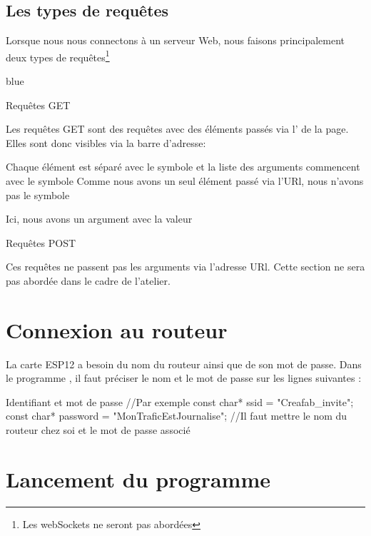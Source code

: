 \subsection{Les types de requêtes}

Lorsque nous nous connectons à un serveur Web, nous faisons principalement deux types de requêtes\footnote{Les webSockets ne 
seront pas abordées}
\begin{items}{blue}{\Triangle}
\item Requêtes GET

Les requêtes GET sont des requêtes avec des éléments passés via l' de la page.
Elles sont donc visibles via la barre d'adresse: 


Chaque élément est séparé avec le symbole  et la liste des arguments commencent avec le symbole  
Comme nous avons un seul élément passé via l'URl, nous n'avons pas le symbole 

Ici, nous avons un argument  avec la valeur 

\item Requêtes POST

Ces requêtes ne passent pas les arguments via l'adresse URl. Cette section ne sera pas abordée dans le cadre de l'atelier.
\end{items}

\section{Connexion au routeur}

La carte ESP12 a besoin du nom du routeur ainsi que de son mot de passe. 
Dans le programme , il faut préciser le nom et le mot de passe sur les lignes suivantes : 

\begin{Cpp}{Identifiant et mot de passe}
//Par exemple
const char* ssid     = "Creafab_invite";
const char* password = "MonTraficEstJournalise";
//Il faut mettre le nom du routeur chez soi et le mot de passe associé
\end{Cpp}



\section{Lancement du programme}

